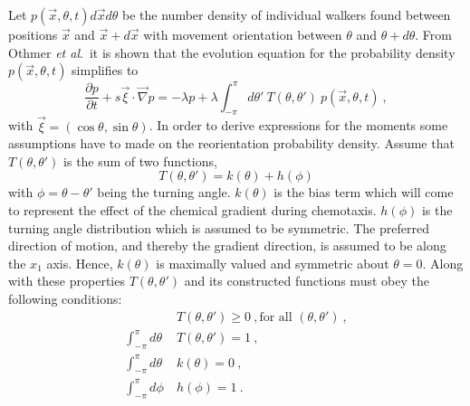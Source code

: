 Let $p(\vec{x},\theta,t) d\vec{x} d\theta$ be the number density of individual walkers found between positions $\vec{x}$ and $\vec{x}+d\vec{x}$ with movement orientation between $\theta$ and $\theta + d\theta$. From Othmer \textit{et al}.\ it is shown that the evolution equation for the probability density $p(\vec{x},\theta,t)$ simplifies to
\begin{equation} \label{eq:p1}
    \frac{\partial p}{\partial t} + s \vec{\xi}\cdot\vec{\nabla} p =
    -\lambda p + \lambda \int_{-\pi}^{\pi} d\theta' \ T(\theta,\theta') \ p(\vec{x},\theta,t) \ ,
\end{equation}
with $\vec{\xi} = (\cos\theta,\sin\theta)$. In order to derive expressions for the moments some assumptions have to made on the reorientation probability density. Assume that $T(\theta,\theta')$ is the sum of two functions,
\begin{equation} \label{eq:t1}
    T(\theta,\theta') = k(\theta) + h(\phi)
\end{equation}
with $\phi = \theta - \theta'$ being the turning angle. $k(\theta)$ is the bias term which will come to represent the effect of the chemical gradient during chemotaxis. $h(\phi)$ is the turning angle distribution which is assumed to be symmetric. The preferred direction of motion, and thereby the gradient direction, is assumed to be along the $x_1$ axis. Hence, $k(\theta)$ is maximally valued and symmetric about $\theta = 0$. Along with these properties $T(\theta,\theta')$ and its constructed functions must obey the following conditions:
\begin{align} \label{eq:t2}
    &T(\theta,\theta') \geq 0 \ , \text{for all } (\theta,\theta') \ , \\
    \int_{-\pi}^{\pi} d\theta \ &T(\theta,\theta') = 1 \ , \label{eq:t3} \\
    \int_{-\pi}^{\pi} d\theta  \ &k(\theta)         = 0 \ , \label{eq:t4} \\
    \int_{-\pi}^{\pi} d\phi    \ &h(\phi)           = 1 \ . \label{eq:t5}
\end{align}


